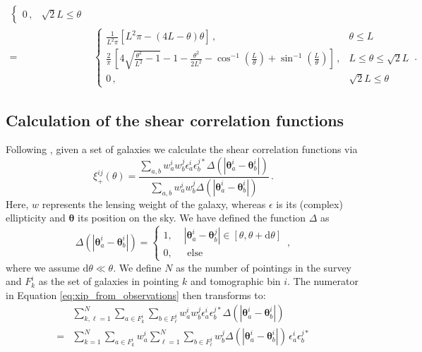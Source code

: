 \documentclass[referee]{aa} %
\renewcommand{\[}{\begin{equation}}
\renewcommand{\]}{\end{equation}}
\renewcommand{\rm}{\mathrm}
\def\inv{^{-1}}
\def\b#1{\bm{#1}}
\begin{document}
\begin{appendix}
\begin{align}
\begin{cases}
0\, , &\sqrt{2}L \leq\theta
\end{cases} \nonumber\\[10pt]
 = & \begin{cases}
\frac{1}{L^2 \pi}\left[L^2\pi - (4L-\theta) \theta\right]\, ,  & \theta \leq L \\[10pt]
\frac{2}{\pi}\,\left[4\sqrt{\frac{\theta^2}{L^2}-1} -1 - \frac{\theta^2}{2L^2} - \cos\inv\left(\frac{L}{\theta}\right) + \sin\inv\left(\frac{L}{\theta}\right)\right]\, ,  & L  \leq \theta \leq \sqrt{2}L \\[10pt]
0\, ,  & \sqrt{2}L \leq \theta
\end{cases}\, .
\end{align}

\subsection{Calculation of the shear correlation functions}
\label{sec:calc of xipm}
Following \citet{2017MNRAS.465.1454H}, given a set of galaxies we calculate the shear correlation functions via \begin{equation}
\xi^{ij}_+(\theta) = \frac{\sum_{a,b}w_a^iw_b^j\epsilon_a^i\epsilon_b^{j*}\Delta(|\b\theta_a^i-\b\theta_b^i|)}{\sum_{a,b}w_a^iw_b^j\Delta(|\b\theta_a^i-\b\theta_b^i|)}\, .
\label{eq:xip_from_observations}
\end{equation}
Here, $w$ represents the lensing weight of the galaxy, whereas $\epsilon$ is its (complex) ellipticity and $\b \theta$ its position on the sky. We have defined the function $\Delta$ as \[
\Delta(|\b\theta_a^i-\b\theta_b^i|) = \begin{cases}
1, \,\, & |\b\theta_a^i-\b\theta_b^j| \in [\theta,\theta+{\rm d}\theta] \\
0, & \text{ else}
\end{cases}\, ,
\]
where we assume ${\rm d}\theta \ll \theta$. We define $N$ as the number of pointings in the survey and $F_k^i$ as the set of galaxies in pointing $k$ and tomographic bin $i$. The numerator in Equation \eqref{eq:xip_from_observations} then transforms to: \begin{align}
& \sum_{k,\ell=1}^N \sum_{a\in F_k^i}\sum_{b\in F_{\ell}^j} w_a^iw_b^j\epsilon_a^i\epsilon_b^{j*} \Delta(|\b\theta_a^i-\b\theta_b^i|) \nonumber\\
 = & \sum_{k=1}^N\sum_{a\in F_k^i}w_a^i \sum_{\ell=1}^N \sum_{b\in F_{\ell}^j} w_b^j \Delta(|\b\theta_a^i-\b\theta_b^i|)\, \epsilon_a^i\epsilon_b^{j*} \nonumber\\

\end{align}
\end{appendix}
\end{document}
